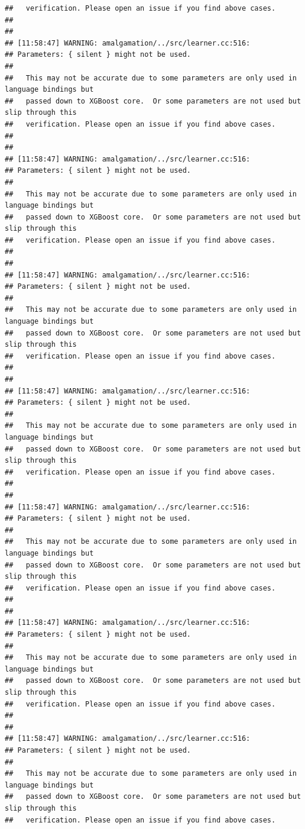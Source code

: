 \documentclass[AMS,STIX2COL]{WileyNJD-v2}\usepackage[]{graphicx}\usepackage[]{color}
\makeatletter
\newenvironment{kframe}{%
 \def\at@end@of@kframe{}%
 \ifinner\ifhmode%
  \def\at@end@of@kframe{\end{minipage}}%
  \begin{minipage}{\columnwidth}%
 \fi\fi%
 \def\FrameCommand##1{\hskip\@totalleftmargin \hskip-\fboxsep
 \colorbox{shadecolor}{##1}\hskip-\fboxsep
     \hskip-\linewidth \hskip-\@totalleftmargin \hskip\columnwidth}%
 \MakeFramed {\advance\hsize-\width
   \@totalleftmargin\z@ \linewidth\hsize
   \@setminipage}}%
 {\par\unskip\endMakeFramed%
 \at@end@of@kframe}
\newenvironment{knitrout}{}{} %
\makeatother
\begin{document}
\begin{knitrout}
\begin{kframe}
\begin{verbatim}
##   verification. Please open an issue if you find above cases.
## 
## 
## [11:58:47] WARNING: amalgamation/../src/learner.cc:516: 
## Parameters: { silent } might not be used.
## 
##   This may not be accurate due to some parameters are only used in language bindings but
##   passed down to XGBoost core.  Or some parameters are not used but slip through this
##   verification. Please open an issue if you find above cases.
## 
## 
## [11:58:47] WARNING: amalgamation/../src/learner.cc:516: 
## Parameters: { silent } might not be used.
## 
##   This may not be accurate due to some parameters are only used in language bindings but
##   passed down to XGBoost core.  Or some parameters are not used but slip through this
##   verification. Please open an issue if you find above cases.
## 
## 
## [11:58:47] WARNING: amalgamation/../src/learner.cc:516: 
## Parameters: { silent } might not be used.
## 
##   This may not be accurate due to some parameters are only used in language bindings but
##   passed down to XGBoost core.  Or some parameters are not used but slip through this
##   verification. Please open an issue if you find above cases.
## 
## 
## [11:58:47] WARNING: amalgamation/../src/learner.cc:516: 
## Parameters: { silent } might not be used.
## 
##   This may not be accurate due to some parameters are only used in language bindings but
##   passed down to XGBoost core.  Or some parameters are not used but slip through this
##   verification. Please open an issue if you find above cases.
## 
## 
## [11:58:47] WARNING: amalgamation/../src/learner.cc:516: 
## Parameters: { silent } might not be used.
## 
##   This may not be accurate due to some parameters are only used in language bindings but
##   passed down to XGBoost core.  Or some parameters are not used but slip through this
##   verification. Please open an issue if you find above cases.
## 
## 
## [11:58:47] WARNING: amalgamation/../src/learner.cc:516: 
## Parameters: { silent } might not be used.
## 
##   This may not be accurate due to some parameters are only used in language bindings but
##   passed down to XGBoost core.  Or some parameters are not used but slip through this
##   verification. Please open an issue if you find above cases.
## 
## 
## [11:58:47] WARNING: amalgamation/../src/learner.cc:516: 
## Parameters: { silent } might not be used.
## 
##   This may not be accurate due to some parameters are only used in language bindings but
##   passed down to XGBoost core.  Or some parameters are not used but slip through this
##   verification. Please open an issue if you find above cases.

\end{verbatim}
\end{kframe}
\end{knitrout}
\end{document}
